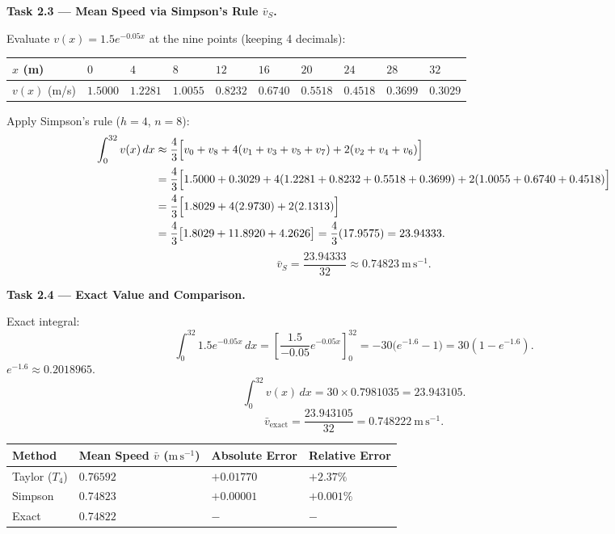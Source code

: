 \documentclass[11pt]{article}
\begin{document}
\textbf{Task 2.3 — Mean Speed via Simpson's Rule $\bar v_S$.}\par
Evaluate $v(x)=1.5e^{-0.05x}$ at the nine points (keeping 4 decimals):

\begin{center}
\begin{tabularx}{\linewidth}{|l|X|X|X|X|X|X|X|X|X|}
\hline
\rowcolor{popblueL} $x$ (m) & $0$ & $4$ & $8$ & $12$ & $16$ & $20$ & $24$ & $28$ & $32$ \\
\hline
$v(x)$ (m/s) & $1.5000$ & $1.2281$ & $1.0055$ & $0.8232$ & $0.6740$ & $0.5518$ & $0.4518$ & $0.3699$ & $0.3029$ \\
\hline
\end{tabularx}
\end{center}

Apply Simpson's rule ($h=4$, $n=8$):
\begin{align*}
\int_{0}^{32} v(x)\,dx &\approx \frac{4}{3}\Bigl[ v_0 + v_8 + 4(v_1+v_3+v_5+v_7) + 2(v_2+v_4+v_6) \Bigr] \\
&= \frac{4}{3}\Bigl[ 1.5000 + 0.3029 + 4(1.2281+0.8232+0.5518+0.3699) + 2(1.0055+0.6740+0.4518) \Bigr] \\
&= \frac{4}{3}\Bigl[ 1.8029 + 4(2.9730) + 2(2.1313) \Bigr] \\
&= \frac{4}{3}\bigl[ 1.8029 + 11.8920 + 4.2626 \bigr] = \frac{4}{3}(17.9575) = 23.94333.
\end{align*}
\[ \bar v_S = \frac{23.94333}{32} \approx 0.74823\ \mathrm{m\,s^{-1}}. \]

\textbf{Task 2.4 — Exact Value and Comparison.}\par
Exact integral:
\[ \int_{0}^{32} 1.5 e^{-0.05x}\,dx = \left[ \frac{1.5}{-0.05} e^{-0.05x} \right]_{0}^{32} = -30 \bigl( e^{-1.6} - 1 \bigr) = 30(1 - e^{-1.6}). \]
$e^{-1.6} \approx 0.2018965$.
\[ \int_{0}^{32} v(x)\,dx = 30 \times 0.7981035 = 23.943105. \]
\[ \bar v_{\text{exact}} = \frac{23.943105}{32} = 0.748222\ \mathrm{m\,s^{-1}}. \]

\begin{center}
\begin{tabularx}{\linewidth}{|l|X|X|X|}
\hline
\rowcolor{popblueL} Method & Mean Speed $\bar v$ ($\mathrm{m\,s^{-1}}$) & Absolute Error & Relative Error \\
\hline
Taylor ($T_4$) & $0.76592$ & $+0.01770$ & $+2.37\%$ \\
Simpson & $0.74823$ & $+0.00001$ & $+0.001\%$ \\
Exact & $0.74822$ & $-$ & $-$ \\
\hline
\end{tabularx}
\end{center}
\end{document}
